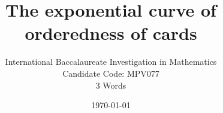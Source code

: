 \newcommand{\thesubtitle}{}
\newcommand{\subtitle}[1]{\renewcommand{\thesubtitle}{#1}}

\title{The exponential curve of orderedness of cards}
\subtitle{What relationship and/or asymptote best describes the orderedness of cards, as more rounds are played in a game of Speed?}
\author{International Baccalaureate Investigation in Mathematics \\ Candidate Code: MPV077 \\ 3 Words}
\date{\today}

\pagestyle{empty}
\tableofcontents
\newpage
\pagestyle{fancy}
